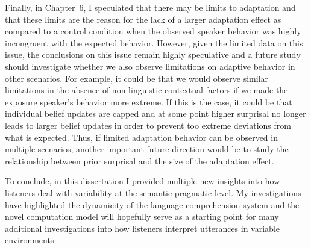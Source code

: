 Finally, in Chapter~6, I speculated that there may be limits to adaptation and that these limits are the reason for the lack of a larger adaptation effect as compared to a control condition when the observed speaker behavior was highly incongruent with the expected behavior. However, given the limited data on this issue, the conclusions on this issue remain highly speculative and a future study should investigate whether we also observe limitations on adaptive behavior in other scenarios. For example, it could be that we would observe similar limitations in the absence of non-linguistic contextual factors if we made the exposure speaker's behavior more extreme. If this is the case, it could be that individual belief updates are capped and at some point higher surprisal no longer leads to larger belief updates in order to prevent too extreme deviations from what is expected. Thus, if limited adaptation behavior can be observed in multiple scenarios, another important future direction would be to study the relationship between prior surprisal and the size of the adaptation effect.

\pagebreak

To conclude, in this dissertation I provided multiple new insights into how listeners deal with variability at the semantic-pragmatic level. My investigations have highlighted the dynamicity of the language comprehension system and the novel computation model will hopefully serve as a starting point for many additional investigations into how listeners interpret utterances in variable environments.


